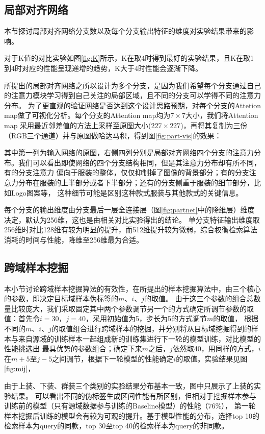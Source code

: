 \subsection{局部对齐网络}
本节探讨局部对齐网络分支数以及每个分支输出特征的维度对实验结果带来的影响。

对于K值的对比实验如图\ref{fig:K}所示，K在取4时得到最好的实验结果，且K在取1到4时对应的性能呈现递增的趋势，K大于4时性能会逐渐下降。

所提出的局部对齐网络之所以设计为多个分支，是因为我们希望每个分支通过自己的注意力模块学习得到自己关注的局部区域，且不同的分支可以学得不同的注意力分布。
为了更直观的验证网络是否达到这个设计思路预期，对每个分支的Attetion map做了可视化分析。每个分支的Attention map均为$7 \times 7$大小，我们将Attention map
采用最近邻差值的方法上采样至原图大小($227 \times 227$)，再将其复制为三份（RGB三个通道）并与原图做哈达马积，得到图\ref{fig:part-vis}的效果：

其中第一列为输入网络的原图，右侧四列分别是局部对齐网络四个分支的注意力分布。我们可以看出即使网络的四个分支结构相同，但是其注意力分布却有所不同，有的分支注意力
偏向于服装的整体，仅仅抑制掉了图像的背景部分；有的分支注意力分布在服装的上半部分或者下半部分；还有的分支侧重于服装的细节部分，比如Logo图案等，
这种细节可能是区别这种款式服装与其他款式的关键信息。


每个分支的输出维度由分支最后一层全连接层（图\ref{fig:partnet}中的降维层）维度决定，默认为256维，这也是由相关对比实验得出的结论。
单分支特征输出维度取256维时对比128维有较为明显的提升，而512维提升较为微弱，综合权衡检索算法消耗的时间与性能，降维至256维最为合适。
\subsection{跨域样本挖掘}
本小节讨论跨域样本挖掘算法的有效性，在所提出的样本挖掘算法中，由三个核心的参数，即决定目标域样本伪标签的$m$、$i$、$j$的取值。
由于这三个参数的组合总数量比较庞大，我们采取固定其中两个参数调节另一个的方式确定所调节参数的取值：首先令$i=30$，$j=40$，采用初始值为5，步长为5的方式调节$m$的取值，
根据不同的$m$、$i$、$j$的取值组合进行跨域样本的挖掘，并分别将从目标域挖掘得到的样本与来自源域的训练样本一起组成新的训练集进行下一轮的模型训练，对比模型的性能挑选出
最具优势的参数组合；确定下来$m$之后，$j$依然取40，用同样的方式，$i$在$m+5$至$j-5$之间调节，根据下一轮模型的性能确定$i$的取值。实验结果见图\ref{fig:mij}，

由于上装、下装、群装三个类别的实验结果分布基本一致，图中只展示了上装的实验结果。
可以看出不同的伪标签生成区间性能有所区别，但相对于挖掘样本参与训练前的模型（只有源域数据参与训练的Baseline模型）的性能（76\%），
第一轮样本挖掘后训练的模型会有较为可观的提升。基于模型性能的分布，选择top 10的检索样本为query的同款，top 30至top 40的检索样本为query的非同款。


